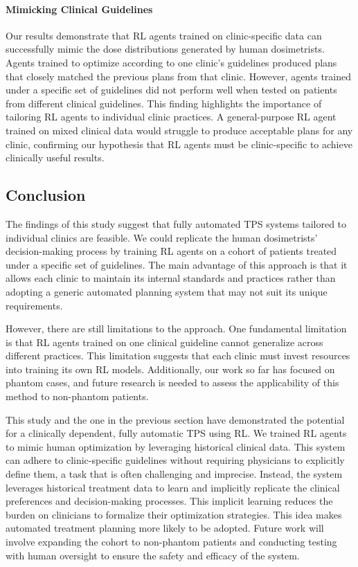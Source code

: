 \paragraph{Mimicking Clinical Guidelines}
Our results demonstrate that RL agents trained on clinic-specific data can successfully mimic the dose distributions generated by human dosimetrists.
Agents trained to optimize according to one clinic's guidelines produced plans that closely matched the previous plans from that clinic.
However, agents trained under a specific set of guidelines did not perform well when tested on patients from different clinical guidelines.
This finding highlights the importance of tailoring RL agents to individual clinic practices.
A general-purpose RL agent trained on mixed clinical data would struggle to produce acceptable plans for any clinic, confirming our hypothesis that RL agents must be clinic-specific to achieve clinically useful results.

\subsection{Conclusion}
The findings of this study suggest that fully automated TPS systems tailored to individual clinics are feasible.
We could replicate the human dosimetrists' decision-making process by training RL agents on a cohort of patients treated under a specific set of guidelines.
The main advantage of this approach is that it allows each clinic to maintain its internal standards and practices rather than adopting a generic automated planning system that may not suit its unique requirements.

However, there are still limitations to the approach.
One fundamental limitation is that RL agents trained on one clinical guideline cannot generalize across different practices.
This limitation suggests that each clinic must invest resources into training its own RL models.
Additionally, our work so far has focused on phantom cases, and future research is needed to assess the applicability of this method to non-phantom patients.

This study and the one in the previous section have demonstrated the potential for a clinically dependent, fully automatic TPS using RL.
We trained RL agents to mimic human optimization by leveraging historical clinical data.
This system can adhere to clinic-specific guidelines without requiring physicians to explicitly define them, a task that is often challenging and imprecise.
Instead, the system leverages historical treatment data to learn and implicitly replicate the clinical preferences and decision-making processes.
This implicit learning reduces the burden on clinicians to formalize their optimization strategies.
This idea makes automated treatment planning more likely to be adopted.
Future work will involve expanding the cohort to non-phantom patients and conducting testing with human oversight to ensure the safety and efficacy of the system.
